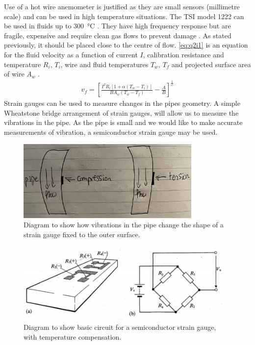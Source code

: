 \documentclass[11pt]{article}
\numberwithin{equation}{section}
\begin{document}
Use of a hot wire anemometer is justified as they are small sensors (millimetre scale) and can be used in high temperature situations. The TSI model 1222 can be used in fluids up to \SI{300}{\celsius} \cite{b3}. They have high frequency response but are fragile, expensive and require clean gas flows to prevent damage \cite{b3}. As stated previously, it should be placed close to the centre of flow. \ref{eq:q2i1} is an equation for the fluid velocity as a function of current $I$, calibration resistance and temperature $R_i$, $T_i$, wire and fluid temperatures $T_w$, $T_f$ and projected surface area of wire $A_w$ \cite{b2}.
\begin{align}
    v_f = \left[\frac{I^2 R_{i}\left[1 + \alpha \left(T_w - T_i\right)\right]}{BA_w \left(T_w - T_f\right)}-\frac{A}{B}\right]^{\frac{1}{c}} \label{eq:q2i1}
\end{align}
Strain gauges can be used to measure changes in the pipes geometry. A simple Wheatstone bridge arrangement of strain gauges, will allow us to measure the vibrations in the pipe. As the pipe is small and we would like to make accurate measurements of vibration, a semiconductor strain gauge may be used. 
\begin{figure}[H]
    \centering
    \includegraphics[height = 4cm]{./img/q2i3.jpg}
    \caption{Diagram to show how vibrations in the pipe change the shape of a strain gauge fixed to the outer surface.} 
    \label{fig:q2i3}
\end{figure}
\begin{figure}[H]
    \centering
    \includegraphics[height = 4cm]{./img/q2i2.png}
    \caption{Diagram to show basic circuit for a semiconductor strain gauge, with temperature compensation.} 
    \label{fig:q2i2}
\end{figure}
\end{document}
